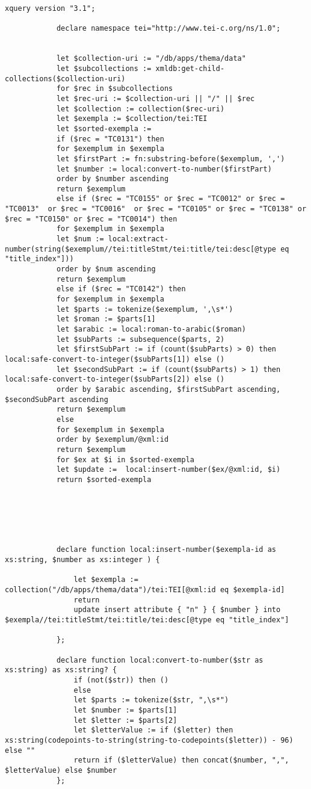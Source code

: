 		\begin{lstlisting}[breaklines=true]
			xquery version "3.1";
			
			declare namespace tei="http://www.tei-c.org/ns/1.0";
			
			
			let $collection-uri := "/db/apps/thema/data"
			let $subcollections := xmldb:get-child-collections($collection-uri)
			for $rec in $subcollections
			let $rec-uri := $collection-uri || "/" || $rec
			let $collection := collection($rec-uri)
			let $exempla := $collection/tei:TEI
			let $sorted-exempla :=
			if ($rec = "TC0131") then
			for $exemplum in $exempla
			let $firstPart := fn:substring-before($exemplum, ',')
			let $number := local:convert-to-number($firstPart)
			order by $number ascending
			return $exemplum
			else if ($rec = "TC0155" or $rec = "TC0012" or $rec = "TC0013"  or $rec = "TC0016"  or $rec = "TC0105" or $rec = "TC0138" or $rec = "TC0150" or $rec = "TC0014") then
			for $exemplum in $exempla
			let $num := local:extract-number(string($exemplum//tei:titleStmt/tei:title/tei:desc[@type eq "title_index"]))
			order by $num ascending
			return $exemplum
			else if ($rec = "TC0142") then
			for $exemplum in $exempla
			let $parts := tokenize($exemplum, ',\s*')
			let $roman := $parts[1]
			let $arabic := local:roman-to-arabic($roman)
			let $subParts := subsequence($parts, 2)
			let $firstSubPart := if (count($subParts) > 0) then local:safe-convert-to-integer($subParts[1]) else ()
			let $secondSubPart := if (count($subParts) > 1) then local:safe-convert-to-integer($subParts[2]) else ()
			order by $arabic ascending, $firstSubPart ascending, $secondSubPart ascending
			return $exemplum
			else
			for $exemplum in $exempla
			order by $exemplum/@xml:id
			return $exemplum
			for $ex at $i in $sorted-exempla
			let $update :=  local:insert-number($ex/@xml:id, $i)
			return $sorted-exempla
			
			
			
			
			
			
			declare function local:insert-number($exempla-id as xs:string, $number as xs:integer ) {
				
				let $exempla := collection("/db/apps/thema/data")/tei:TEI[@xml:id eq $exempla-id]
				return
				update insert attribute { "n" } { $number } into $exempla//tei:titleStmt/tei:title/tei:desc[@type eq "title_index"]
				
			};
			
			declare function local:convert-to-number($str as xs:string) as xs:string? {
				if (not($str)) then ()
				else
				let $parts := tokenize($str, ",\s*")
				let $number := $parts[1]
				let $letter := $parts[2]
				let $letterValue := if ($letter) then xs:string(codepoints-to-string(string-to-codepoints($letter)) - 96) else ""
				return if ($letterValue) then concat($number, ",", $letterValue) else $number
			};
			

\end{lstlisting}
